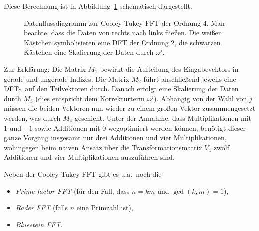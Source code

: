 Diese Berechnung ist in Abbildung~\ref{fig:cooley-tukey-fft} schematisch dargestellt.
\begin{figure}[ht]
\centering
{}
  \caption{Datenflussdiagramm zur Cooley-Tukey-FFT der Ordnung $ 4 $. Man beachte, dass die Daten
  von rechts nach links fließen. Die weißen Kästchen symbolisieren eine DFT der Ordnung $ 2 $,
  die schwarzen Kästchen eine Skalierung der Daten durch $ \omega^{j} $.}
  \label{fig:cooley-tukey-fft}
\end{figure}
Zur Erklärung: Die Matrix $ M_{1} $ bewirkt die Aufteilung des Eingabevektors in gerade und ungerade
Indizes. Die Matrix $ M_{2} $ führt anschließend jeweils eine $ \operatorname{DFT}_{2} $ auf den Teilvektoren 
durch. Danach erfolgt eine Skalierung der Daten durch $ M_{3} $ (dies entspricht dem Korrekturterm
$ \omega^{j} $). Abhängig von der Wahl von $ j $ müssen die beiden Vektoren nun wieder zu einem
großen Vektor zusammengesetzt werden, was durch $ M_{4} $ geschieht. Unter der Annahme, dass 
Multiplikationen mit $ 1 $ und $ -1 $ sowie Additionen mit $ 0 $ wegoptimiert werden können, 
benötigt dieser ganze Vorgang insgesamt nur drei Additionen und vier Multiplikationen, wohingegen 
beim naiven Ansatz über die Transformationsmatrix $ V_{4} $ zwölf Additionen und vier 
Multiplikationen auszuführen sind.

Neben der Cooley-Tukey-FFT gibt es u.a.\ noch die
\begin{itemize}
\item \emph{Prime-factor FFT} (für den Fall, dass $ n = km $ und $ \gcd(k,m) = 1 $),
\item \emph{Rader FFT} (falls $ n $ eine Primzahl ist),
\item \emph{Bluestein FFT}.
\end{itemize}